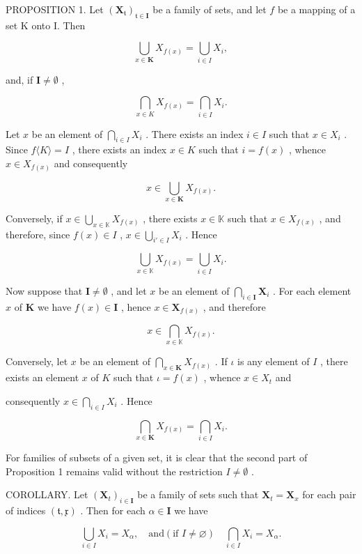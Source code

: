 PROPOSITION 1. Let \((\mathbf{X}_{\mathfrak{t}})_{\mathfrak{t}\in \mathbf{I}}\) be a family of sets, and let \(f\) be a mapping of a set K onto I. Then

\[
\bigcup_ {x \in \mathbf {K}} X _ {f (x)} = \bigcup_ {i \in I} X _ {i},
\]

and, if \(\mathbf{I} \neq \emptyset\) ,

\[
\bigcap_ {x \in K} X _ {f (x)} = \bigcap_ {i \in I} X _ {i}.
\]

Let \(x\) be an element of \(\bigcap_{i \in I} X_i\) . There exists an index \(i \in I\) such that \(x \in X_i\) . Since \(f\langle K \rangle = I\) , there exists an index \(x \in K\) such that \(i = f(x)\) , whence \(x \in X_{f(x)}\) and consequently

\[
x \in \bigcup_ {x \in \mathbf {K}} X _ {f (x)}.
\]

Conversely, if \(x \in \bigcup_{x \in \mathbb{K}} X_{f(x)}\) , there exists \(x \in \mathbb{K}\) such that \(x \in X_{f(x)}\) , and therefore, since \(f(x) \in I\) , \(x \in \bigcup_{i' \in I} X_i\) . Hence

\[
\bigcup_ {x \in \mathbb {K}} X _ {f (x)} = \bigcup_ {i \in I} X _ {i}.
\]

Now suppose that \(\mathbf{I} \neq \emptyset\) , and let \(x\) be an element of \(\bigcap_{i \in \mathbf{I}} \mathbf{X}_i\) . For each element \(x\) of \(\mathbf{K}\) we have \(f(x) \in \mathbf{I}\) , hence \(x \in \mathbf{X}_{f(x)}\) , and therefore

\[
x \in \bigcap_ {x \in \mathbb {K}} X _ {f (x)}.
\]

Conversely, let \(x\) be an element of \(\bigcap_{x \in \mathbf{K}} X_{f(x)}\) . If \(\iota\) is any element of \(I\) , there exists an element \(x\) of \(K\) such that \(\iota = f(x)\) , whence \(x \in X_t\) and

consequently \(x \in \bigcap_{i \in I} X_i\) . Hence

\[
\bigcap_ {x \in \mathbf {K}} X _ {f (x)} = \bigcap_ {i \in I} X _ {i}.
\]

For families of subsets of a given set, it is clear that the second part of Proposition 1 remains valid without the restriction \(I \neq \emptyset\) .

COROLLARY. Let \((\mathbf{X}_t)_{i\in \mathbf{I}}\) be a family of sets such that \(\mathbf{X}_t = \mathbf{X}_x\) for each pair of indices \((\mathfrak{t},\mathfrak{x})\) . Then for each \(\alpha \in \mathbf{I}\) we have

\[
\bigcup_ {i \in I} X _ {i} = X _ {\alpha}, \quad \text{and} (\text{if } I \neq \varnothing) \quad \bigcap_ {i \in I} X _ {i} = X _ {\alpha}.
\]

